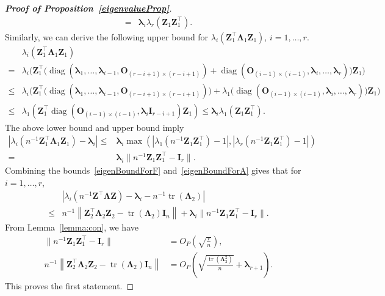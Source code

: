\documentclass[10pt]{book}
\theoremstyle{definition}
\DeclareMathOperator{\mytr}{tr}
\DeclareMathOperator{\mydiag}{diag}
\newcommand{\bZ}{\mathbf{Z}}
\newcommand{\bO}{\mathbf{O}}
\newcommand{\bI}{\mathbf{I}}
\newcommand{\bfsym}[1]{\ensuremath{\boldsymbol{#1}}}
\def\blambda {\bfsym {\lambda}}
\def\bLambda {\bfsym {\Lambda}}
\begin{document}
\begin{proof}[\textbf{Proof of Proposition~\ref{eigenvalueProp}}]
\begin{equation*}
\begin{aligned}
= &
\blambda_i \lambda_r(\bZ_1\bZ_1^\top).
\end{aligned}
\end{equation*}
Similarly, we can derive the following upper bound for
$\lambda_i(\bZ_1^\top \bLambda_1 \bZ_1)$, $i=1,\ldots,r$.
\begin{equation*}
\begin{aligned}
&\lambda_i(\bZ_1^\top \bLambda_1 \bZ_1)
\\
=&\lambda_i\Big(
\bZ_1^\top \big(
\mydiag(\blambda_1,\ldots,\blambda_{i-1},\bO_{(r-i+1)\times(r-i+1)})+
\mydiag(\bO_{(i-1)\times(i-1)},\blambda_i,\ldots,\blambda_r)
\big)
\bZ_1
\Big)\\
\leq&\lambda_i\Big(
\bZ_1^\top \big(
\mydiag(\blambda_1,\ldots,\blambda_{i-1},\bO_{(r-i+1)\times(r-i+1)})
\Big)
+
\lambda_1\Big(
\mydiag(\bO_{(i-1)\times(i-1)},\blambda_i,\ldots,\blambda_r)
\big)
\bZ_1
\Big)\\
    \leq&
\lambda_1(\bZ_1^\top \mydiag(\bO_{(i-1)\times(i-1)},\blambda_i \bI_{r-i+1}) \bZ_1)
\leq  \blambda_i \lambda_1(\bZ_1\bZ_1^\top).
\end{aligned}
\end{equation*}
The above lower bound and upper bound imply
\begin{equation}\label{eigenBoundForA}
    \begin{aligned}
\left|
\lambda_i(n^{-1}\bZ_1^\top \bLambda_1 \bZ_1)-\blambda_i
\right|
\leq&
\blambda_i 
\max\left(
    |\lambda_1(n^{-1}\bZ_1 \bZ_1^\top)-1|,
    |\lambda_r(n^{-1}\bZ_1 \bZ_1^\top)-1|
\right)
\\
=&\blambda_i \|n^{-1}\bZ_1\bZ_1^\top -\bI_r\|.
    \end{aligned}
\end{equation}
Combining the bounds~\eqref{eigenBoundForF} and~\eqref{eigenBoundForA} gives that for $i=1,\ldots,r$,
\begin{equation*}
    \begin{split}
        &
        \left|
        \lambda_i\left(n^{-1}\bZ^\top \bLambda \bZ\right)
        -
        \blambda_i
        -
        n^{-1}\mytr(\bLambda_2)
        \right|
        \\
        \leq&
        n^{-1}\left\|\bZ_2^\top \bLambda_2 \bZ_2-\mytr(\bLambda_2) \bI_n\right\|
        +\blambda_i \|n^{-1}\bZ_1\bZ_1^\top -\bI_r\|.
    \end{split}
\end{equation*}
From Lemma~\ref{lemma:con}, we have
\begin{align}
    \label{conB2B1}
            \|n^{-1}\bZ_1\bZ_1^\top -\bI_r\|&=
            O_P\left(\sqrt{\frac{r}{n}}\right),
        \\
        \label{conB2B}
        n^{-1}\left\|\bZ_2^\top \bLambda_2 \bZ_2-\mytr(\bLambda_2)\bI_n\right\|&=O_P\left(\sqrt{\frac{\mytr(\bLambda_2^2)}{ n}}+\blambda_{r+1}\right).
\end{align}
This proves the first statement.


\end{proof}
\end{document}
